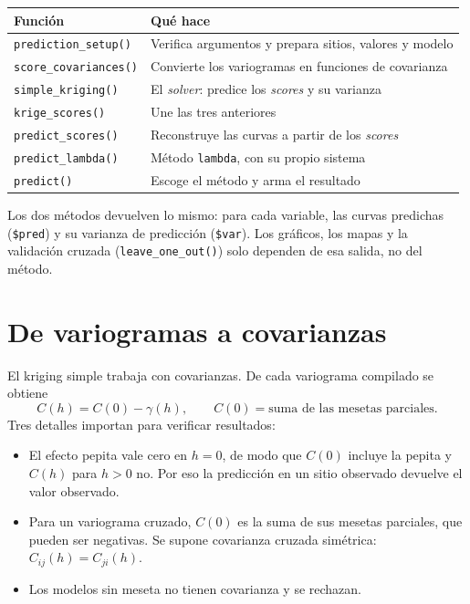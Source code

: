 \documentclass[11pt,a4paper]{article}
\newcommand{\code}[1]{\texttt{#1}}
\begin{document}
\begin{center}
\begin{tabular}{ll}
\hline
Función & Qué hace \\
\hline
\code{prediction\_setup()} & Verifica argumentos y prepara sitios, valores y modelo \\
\code{score\_covariances()} & Convierte los variogramas en funciones de covarianza \\
\code{simple\_kriging()} & El \emph{solver}: predice los \emph{scores} y su varianza \\
\code{krige\_scores()} & Une las tres anteriores \\
\code{predict\_scores()} & Reconstruye las curvas a partir de los \emph{scores} \\
\code{predict\_lambda()} & Método \code{lambda}, con su propio sistema \\
\code{predict()} & Escoge el método y arma el resultado \\
\hline
\end{tabular}
\end{center}

Los dos métodos devuelven lo mismo: para cada variable, las curvas predichas
(\code{\$pred}) y su varianza de predicción (\code{\$var}). Los gráficos, los
mapas y la validación cruzada (\code{leave\_one\_out()}) solo dependen de esa
salida, no del método.

\section{De variogramas a covarianzas}

El kriging simple trabaja con covarianzas. De cada variograma compilado se
obtiene
\[
  C(h) = C(0) - \gamma(h), \qquad C(0) = \text{suma de las mesetas parciales}.
\]
Tres detalles importan para verificar resultados:
\begin{itemize}
  \item El efecto pepita vale cero en $h = 0$, de modo que $C(0)$ incluye la
        pepita y $C(h)$ para $h > 0$ no. Por eso la predicción en un sitio
        observado devuelve el valor observado.
  \item Para un variograma cruzado, $C(0)$ es la suma de sus mesetas
        parciales, que pueden ser negativas. Se supone covarianza cruzada
        simétrica: $C_{ij}(h) = C_{ji}(h)$.
  \item Los modelos sin meseta no tienen covarianza y se rechazan.
\end{itemize}
\end{document}
